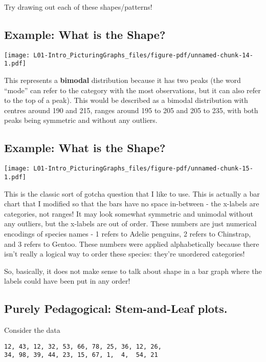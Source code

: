 \documentclass[
  letterpaper,
  DIV=11,
  numbers=noendperiod]{scrreprt}
\begin{document}
Try drawing out each of these shapes/patterns!

\hypertarget{example-what-is-the-shape}{%
\subsection{Example: What is the
Shape?}\label{example-what-is-the-shape}}

\texttt{[image: L01-Intro\_PicturingGraphs\_files/figure-pdf/unnamed-chunk-14-1.pdf]}

This represents a \textbf{bimodal} distribution because it has two peaks
(the word ``mode'' can refer to the category with the most observations,
but it can also refer to the top of a peak). This would be described as
a bimodal distribution with centres around 190 and 215, ranges around
195 to 205 and 205 to 235, with both peaks being symmetric and without
any outliers.

\hypertarget{example-what-is-the-shape-1}{%
\subsection{Example: What is the
Shape?}\label{example-what-is-the-shape-1}}

\texttt{[image: L01-Intro\_PicturingGraphs\_files/figure-pdf/unnamed-chunk-15-1.pdf]}

This is the classic sort of gotcha question that I like to use. This is
actually a bar chart that I modified so that the bars have no space
in-between - the x-labels are categories, not ranges! It may look
somewhat symmetric and unimodal without any outliers, but the x-labels
are out of order. These numbers are just numerical encodings of species
names - 1 refers to Adelie penguins, 2 refers to Chinstrap, and 3 refers
to Gentoo. These numbers were applied alphabetically because there isn't
really a logical way to order these species: they're unordered
categories!

So, basically, it does not make sense to talk about shape in a bar graph
where the labels could have been put in any order!

\hypertarget{purely-pedagogical-stem-and-leaf-plots.}{%
\subsection{Purely Pedagogical: Stem-and-Leaf
plots.}\label{purely-pedagogical-stem-and-leaf-plots.}}

Consider the data

\begin{verbatim}
12, 43, 12, 32, 53, 66, 78, 25, 36, 12, 26,
34, 98, 39, 44, 23, 15, 67, 1,  4,  54, 21
\end{verbatim}
\end{document}
